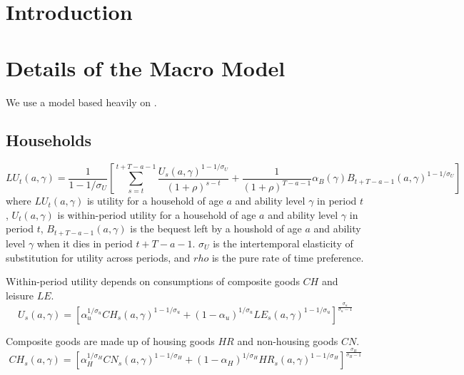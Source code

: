 \documentclass[letterpaper,12pt]{article}
\theoremstyle{definition}
\numberwithin{equation}{section}
\begin{document}
\begin{spacing}{1.5}


\section{Introduction}\label{SecIntro}

\section{Details of the Macro Model}\label{SecMacro}

  We use a model based heavily on \citet{ZodrowDiamond:2013}.

  \subsection{Households}

  \begin{equation}
  LU_t(a,\gamma) = \frac{1}{1-1/\sigma_U} \left[ \sum_{s=t}^{t+T-a-1} \frac{U_s(a,\gamma)^{1-1/\sigma_U}}{(1+\rho)^{s-t}} + \frac{1}{(1+\rho)^{T-a-1}} \alpha_B(\gamma)B_{t+T-a-1}(a,\gamma)^{1-1/\sigma_U} \right]
  \end{equation}
  where $LU_t(a,\gamma)$ is utility for a household of age $a$ and ability level $\gamma$ in period $t$, $U_t(a,\gamma)$ is within-period utility for a household of age $a$ and ability level $\gamma$ in period $t$, $B_{t+T-a-1}(a,\gamma)$ is the bequest left by a houshold of age $a$ and ability level $\gamma$ when it dies in period $t+T-a-1$.  $\sigma_U$ is the intertemporal elasticity of substitution for utility across periods, and $rho$ is the pure rate of time preference.

  Within-period utility depends on consumptions of composite goods $CH$ and leisure $LE$.
  \begin{equation}
  U_s(a,\gamma) = \left[ \alpha_u^{1/\sigma_u} CH_s(a,\gamma)^{1-1/\sigma_u} + (1-\alpha_u)^{1/\sigma_u} LE_s(a,\gamma)^{1-1/\sigma_u}\right]^{\frac{\sigma_u}{\sigma_u-1}}
  \end{equation}

  Composite goods are made up of housing goods $HR$ and non-housing goods $CN$.
  \begin{equation}
  CH_s(a,\gamma) = \left[ \alpha_H^{1/\sigma_H} CN_s(a,\gamma)^{1-1/\sigma_H} + (1-\alpha_H)^{1/\sigma_H} HR_s(a,\gamma)^{1-1/\sigma_H}\right]^{\frac{\sigma_H}{\sigma_H-1}}
  \end{equation}


\end{spacing}
\end{document}

